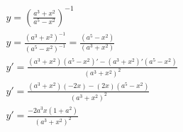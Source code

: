 \begin{ex}
\begin{align}
&y=\left(\frac{a^3+x^2}{a^5-x^2}\right)^{-1}\nonumber\\
&y=\frac{(a^3+x^2)^{-1}}{(a^5-x^2)^{-1}}=\frac{(a^5-x^2)}{(a^3+x^2)}\nonumber\\
&y'=\frac{(a^3+x^2)(a^5-x^2)'-(a^3+x^2)'(a^5-x^2)}{(a^3+x^2)^2}\nonumber\\
&y'=\frac{(a^3+x^2)(-2x)-(2x)(a^5-x^2)}{(a^3+x^2)^2}\nonumber\\
&y'=\frac{-2a^3x(1+a^2)}{(a^3+x^2)^2}\nonumber
\end{align}
\end{ex}